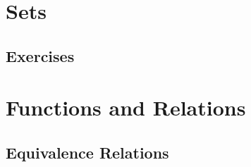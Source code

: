 

\section{Sets}

\subsection{Exercises}


\section{Functions and Relations}


\subsection{Equivalence Relations}

